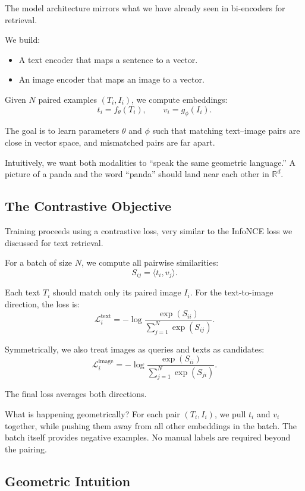 The model architecture mirrors what we have already seen in bi-encoders for retrieval.

We build:
\begin{itemize}
    \item A text encoder that maps a sentence to a vector.
    \item An image encoder that maps an image to a vector.
\end{itemize}

Given $N$ paired examples $(T_i, I_i)$, we compute embeddings:
\[
t_i = f_\theta(T_i), 
\qquad
v_i = g_\phi(I_i).
\]

The goal is to learn parameters $\theta$ and $\phi$ such that matching text–image pairs are close in vector space, and mismatched pairs are far apart.

Intuitively, we want both modalities to ``speak the same geometric language.'' A picture of a panda and the word ``panda'' should land near each other in $\mathbb{R}^d$.

\bigskip
\subsection{The Contrastive Objective}
\medskip

Training proceeds using a contrastive loss, very similar to the InfoNCE loss we discussed for text retrieval.

For a batch of size $N$, we compute all pairwise similarities:
\[
S_{ij} = \langle t_i, v_j \rangle.
\]

Each text $T_i$ should match only its paired image $I_i$. For the text-to-image direction, the loss is:
\[
\mathcal{L}_i^{\text{text}}
=
- \log
\frac{\exp(S_{ii})}
{\sum_{j=1}^{N} \exp(S_{ij})}.
\]

Symmetrically, we also treat images as queries and texts as candidates:
\[
\mathcal{L}_i^{\text{image}}
=
- \log
\frac{\exp(S_{ii})}
{\sum_{j=1}^{N} \exp(S_{ji})}.
\]

The final loss averages both directions.

What is happening geometrically? For each pair $(T_i, I_i)$, we pull $t_i$ and $v_i$ together, while pushing them away from all other embeddings in the batch. The batch itself provides negative examples. No manual labels are required beyond the pairing.

\bigskip
\subsection{Geometric Intuition}
\medskip

